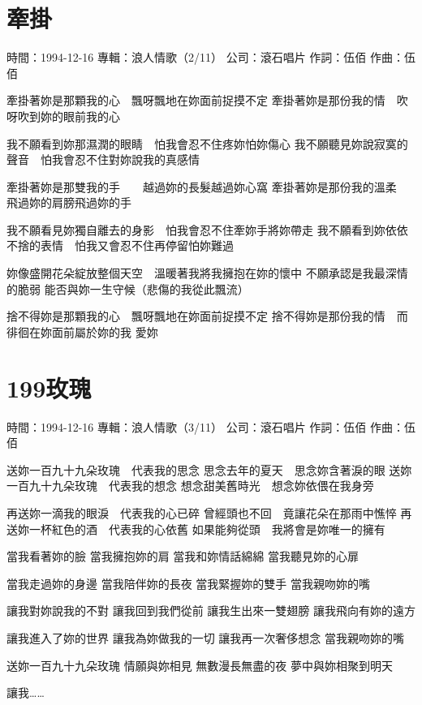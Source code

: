 \documentclass[UTF8,a4paper,oneside,twocolumn,12pt]{ctexbook}
\newcommand{\infopair}[2]{\textbullet #1：#2}
\newcommand{\zc}[1][伍佰]{\infopair{作詞}{#1}}
\newcommand{\zq}[1][伍佰]{\infopair{作曲}{#1}}
\newcommand{\zj}[1]{\infopair{專輯}{#1}}
\newcommand{\sj}[1]{\infopair{時間}{#1}}
\newcommand{\gs}[1]{\infopair{公司}{#1}}
\newenvironment{info}{\begin{flushleft}\kaishu
	}
	{\end{flushleft}\normalsize\yahei\par}
\newenvironment{lyric}{
	}
{}
\begin{document}
\section{牽掛}
\begin{info}
	\sj{1994-12-16}
	\zj{浪人情歌（2/11）}
	\gs{滾石唱片}
	\zc
	\zq
\end{info}
\begin{lyric}
	牽掛著妳是那顆我的心　飄呀飄地在妳面前捉摸不定
	牽掛著妳是那份我的情　吹呀吹到妳的眼前我的心

	我不願看到妳那濕潤的眼睛　怕我會忍不住疼妳怕妳傷心
	我不願聽見妳說寂寞的聲音　怕我會忍不住對妳說我的真感情

	牽掛著妳是那雙我的手　　越過妳的長髮越過妳心窩
	牽掛著妳是那份我的溫柔　飛過妳的肩膀飛過妳的手

	我不願看見妳獨自離去的身影　怕我會忍不住牽妳手將妳帶走
	我不願看到妳依依不捨的表情　怕我又會忍不住再停留怕妳難過

	妳像盛開花朵綻放整個天空　溫暖著我將我擁抱在妳的懷中
	不願承認是我最深情的脆弱
	能否與妳一生守候（悲傷的我從此飄流）

	捨不得妳是那顆我的心　飄呀飄地在妳面前捉摸不定
	捨不得妳是那份我的情　而徘徊在妳面前屬於妳的我
	愛妳
\end{lyric}

\section{199玫瑰}
\begin{info}
	\sj{1994-12-16}
	\zj{浪人情歌（3/11）}
	\gs{滾石唱片}
	\zc
	\zq
\end{info}
\begin{lyric}
	送妳一百九十九朵玫瑰　代表我的思念
	思念去年的夏天　思念妳含著淚的眼
	送妳一百九十九朵玫瑰　代表我的想念
	想念甜美舊時光　想念妳依偎在我身旁

	再送妳一滴我的眼淚　代表我的心已碎
	曾經頭也不回　竟讓花朵在那雨中憔悴
	再送妳一杯紅色的酒　代表我的心依舊
	如果能夠從頭　我將會是妳唯一的擁有

	當我看著妳的臉
	當我擁抱妳的肩
	當我和妳情話綿綿
	當我聽見妳的心扉

	當我走過妳的身邊
	當我陪伴妳的長夜
	當我緊握妳的雙手
	當我親吻妳的嘴

	讓我對妳說我的不對
	讓我回到我們從前
	讓我生出來一雙翅膀
	讓我飛向有妳的遠方

	讓我進入了妳的世界
	讓我為妳做我的一切
	讓我再一次奢侈想念
	當我親吻妳的嘴

	送妳一百九十九朵玫瑰
	情願與妳相見
	無數漫長無盡的夜
	夢中與妳相聚到明天

	讓我……
\end{lyric}
\end{document}
